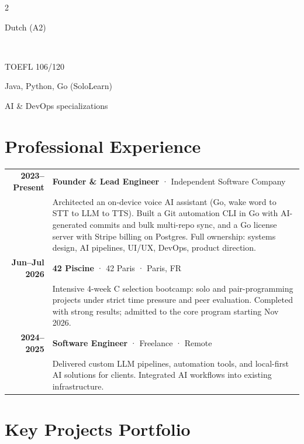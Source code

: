 \documentclass[lighthipster]{simplehipstercv}
\begin{document}
\begin{paracol}{2}
{Dutch (A2)

\bigskip

\\[0.5em]

{\footnotesize TOEFL 106/120

Java, Python, Go (SoloLearn)

AI \& DevOps specializations}

\vfill

}
\switchcolumn

\small
\section*{Professional Experience}

\begin{tabular}{r| p{}}
    \textbf{2023--Present} & \textbf{Founder \& Lead Engineer} · \textcolor{cvgreen}{Independent Software Company} \\
    & {\footnotesize Architected an on-device voice AI assistant (Go, wake word to STT to LLM to TTS). Built a Git automation CLI in Go with AI-generated commits and bulk multi-repo sync, and a Go license server with Stripe billing on Postgres. Full ownership: systems design, AI pipelines, UI/UX, DevOps, product direction.} \\[0.8em]

    \textbf{Jun--Jul 2026} & \textbf{42 Piscine} · \textcolor{cvgreen}{42 Paris} · Paris, FR \\
    & {\footnotesize Intensive 4-week C selection bootcamp: solo and pair-programming projects under strict time pressure and peer evaluation. Completed with strong results; admitted to the core program starting Nov 2026.} \\[0.8em]

    \textbf{2024--2025} & \textbf{Software Engineer} · \textcolor{cvgreen}{Freelance} · Remote \\
    & {\footnotesize Delivered custom LLM pipelines, automation tools, and local-first AI solutions for clients. Integrated AI workflows into existing infrastructure.} \\
\end{tabular}

\vspace{1.2em}

\section*{Key Projects Portfolio}


\end{paracol}
\end{document}
